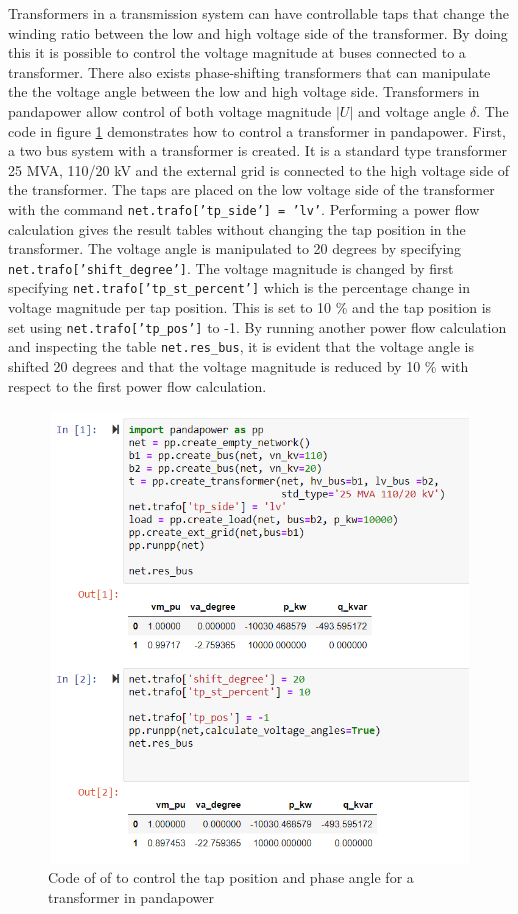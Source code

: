 \documentclass[class=book, crop=false]{standalone}
\begin{document}
Transformers in a transmission system can have controllable taps that change the winding ratio between the low and high voltage side of the transformer. By doing this it is possible to control the voltage magnitude at buses connected to a transformer. There also exists phase-shifting transformers that can manipulate the the voltage angle between the low and high voltage side. Transformers in pandapower allow control of both voltage magnitude $|U|$ and voltage angle $\delta$. The code in figure \ref{fig:method:control_transformer} demonstrates how to control a transformer in pandapower. First, a two bus system with a transformer is created. It is a standard type transformer 25 MVA, 110/20 kV and the external grid is connected to the high voltage side of the transformer. The taps are placed on the low voltage side of the transformer with the command \texttt{net.trafo['tp\_side'] = 'lv'}. Performing a power flow calculation gives the result tables without changing the tap position in the transformer. The voltage angle is manipulated to 20 degrees by specifying \texttt{net.trafo['shift\_degree']}. The voltage magnitude is changed by first specifying \texttt{net.trafo['tp\_st\_percent']} which is the percentage change in voltage magnitude per tap position. This is set to 10 \% and the tap position is set using \texttt{net.trafo['tp\_pos']} to -1. By running another power flow calculation and inspecting the table \texttt{net.res\_bus}, it is evident that the voltage angle is shifted 20 degrees and that the voltage magnitude is reduced by 10 \% with respect to the first power flow calculation. 


\begin{figure}[H]
    \center
    \includegraphics[height=12cm, width=12cm]{figures/control_transformer.PNG}
    \caption[size = 9]{Code of of to control the tap position and phase angle for a transformer in pandapower}
    \label{fig:method:control_transformer}
\end{figure}
\end{document}

